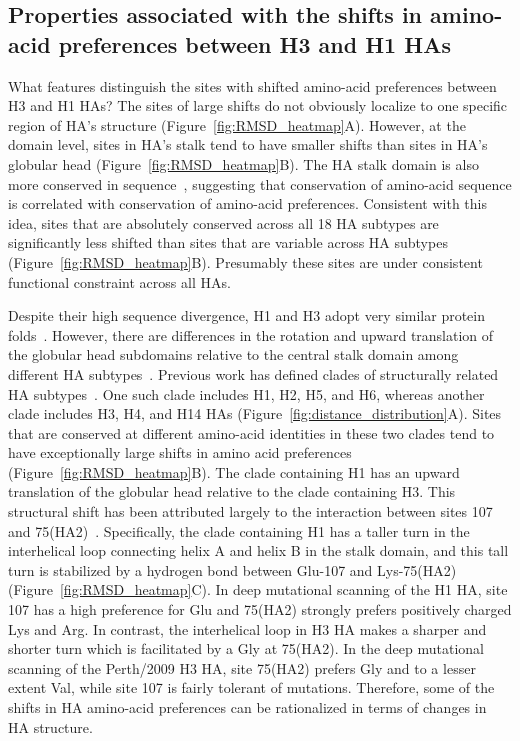 \documentclass[9pt,twocolumn,twoside]{pnas-new}
\begin{document}
\subsection*{Properties associated with the shifts in amino-acid preferences between H3 and H1 HAs}
What features distinguish the sites with shifted amino-acid preferences between H3 and H1 HAs?
The sites of large shifts do not obviously localize to one specific region of HA's structure (Figure~\ref{fig:RMSD_heatmap}A).
However, at the domain level, sites in HA's stalk tend to have smaller shifts than sites in HA's globular head (Figure~\ref{fig:RMSD_heatmap}B).
The HA stalk domain is also more conserved in sequence~\cite{nobusawa1991comparison}, suggesting that conservation of amino-acid sequence is correlated with conservation of amino-acid preferences.
Consistent with this idea, sites that are absolutely conserved across all 18 HA subtypes are significantly less shifted than sites that are variable across HA subtypes (Figure~\ref{fig:RMSD_heatmap}B).
Presumably these sites are under consistent functional constraint across all HAs.

Despite their high sequence divergence, H1 and H3 adopt very similar protein folds~\cite{ha2002h5,russell2004h1}.
However, there are differences in the rotation and upward translation of the globular head subdomains relative to the central stalk domain among different HA subtypes~\cite{ha2002h5,russell2004h1}.
Previous work has defined clades of structurally related HA subtypes~\cite{ha2002h5,russell2004h1}.
One such clade includes H1, H2, H5, and H6, whereas another clade includes H3, H4, and H14 HAs (Figure~\ref{fig:distance_distribution}A).
Sites that are conserved at different amino-acid identities in these two clades tend to have exceptionally large shifts in amino acid preferences (Figure~\ref{fig:RMSD_heatmap}B).
The clade containing H1 has an upward translation of the globular head relative to the clade containing H3.
This structural shift has been attributed largely to the interaction between sites 107 and 75(HA2)~\cite{ha2002h5,russell2004h1}.
Specifically, the clade containing H1 has a taller turn in the interhelical loop connecting helix A and helix B in the stalk domain, and this tall turn is stabilized by a hydrogen bond between Glu-107 and Lys-75(HA2) (Figure~\ref{fig:RMSD_heatmap}C).
In deep mutational scanning of the H1 HA, site 107 has a high preference for Glu and 75(HA2) strongly prefers positively charged Lys and Arg.
In contrast, the interhelical loop in H3 HA makes a sharper and shorter turn which is facilitated by a Gly at 75(HA2).
In the deep mutational scanning of the Perth/2009 H3 HA, site 75(HA2) prefers Gly and to a lesser extent Val, while site 107 is fairly tolerant of mutations.
Therefore, some of the shifts in HA amino-acid preferences can be rationalized in terms of changes in HA structure.
\end{document}
